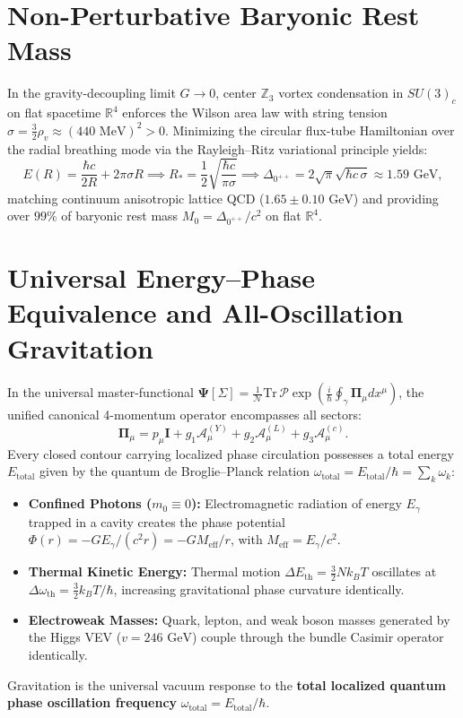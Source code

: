 \documentclass[11pt,a4paper]{article}
\begin{document}
\section{Non-Perturbative Baryonic Rest Mass}
In the gravity-decoupling limit $G \to 0$, center $\mathbb{Z}_3$ vortex condensation in $SU(3)_c$ on flat spacetime $\mathbb{R}^4$ enforces the Wilson area law with string tension $\sigma = \frac{3}{2}\rho_v \approx (440\text{ MeV})^2 > 0$. Minimizing the circular flux-tube Hamiltonian over the radial breathing mode via the Rayleigh--Ritz variational principle yields:
\begin{equation}
E(R) = \frac{\hbar c}{2R} + 2\pi \sigma R \implies R_* = \frac{1}{2}\sqrt{\frac{\hbar c}{\pi\sigma}} \implies \Delta_{0^{++}} = 2\sqrt{\pi}\sqrt{\hbar c \, \sigma} \approx 1.59\text{ GeV},
\end{equation}
matching continuum anisotropic lattice QCD ($1.65 \pm 0.10\text{ GeV}$) and providing over $99\%$ of baryonic rest mass $M_0 = \Delta_{0^{++}}/c^2$ on flat $\mathbb{R}^4$.

\section{Universal Energy--Phase Equivalence and All-Oscillation Gravitation}
In the universal master-functional $\mathbf{\Psi}[\Sigma] = \frac{1}{\mathcal{N}} \mathrm{Tr} \, \mathcal{P} \exp \left( \frac{i}{\hbar} \oint_\gamma \mathbf{\Pi}_\mu dx^\mu \right)$, the unified canonical 4-momentum operator encompasses all sectors:
\begin{equation}
\mathbf{\Pi}_\mu = p_\mu \mathbf{I} + g_1 \mathbf{\mathcal{A}}_\mu^{(Y)} + g_2 \mathbf{\mathcal{A}}_\mu^{(L)} + g_3 \mathbf{\mathcal{A}}_\mu^{(c)}.
\end{equation}
Every closed contour carrying localized phase circulation possesses a total energy $E_{\text{total}}$ given by the quantum de Broglie--Planck relation $\omega_{\text{total}} = E_{\text{total}}/\hbar = \sum_k \omega_k$:
\begin{itemize}
\item \textbf{Confined Photons ($m_0 \equiv 0$):} Electromagnetic radiation of energy $E_\gamma$ trapped in a cavity creates the phase potential $\Phi(r) = - G E_\gamma / (c^2 r) = - G M_{\text{eff}} / r$, with $M_{\text{eff}} = E_\gamma / c^2$.
\item \textbf{Thermal Kinetic Energy:} Thermal motion $\Delta E_{\text{th}} = \frac{3}{2} N k_B T$ oscillates at $\Delta\omega_{\text{th}} = \frac{3}{2} k_B T / \hbar$, increasing gravitational phase curvature identically.
\item \textbf{Electroweak Masses:} Quark, lepton, and weak boson masses generated by the Higgs VEV ($v = 246\text{ GeV}$) couple through the bundle Casimir operator identically.
\end{itemize}
Gravitation is the universal vacuum response to the \textbf{total localized quantum phase oscillation frequency} $\omega_{\text{total}} = E_{\text{total}}/\hbar$.
\end{document}
